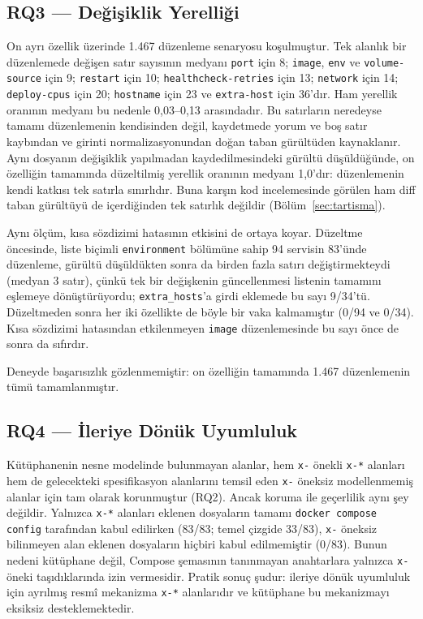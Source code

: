 \documentclass[12pt,a4paper]{article}
\begin{document}
\subsection{RQ3 --- Değişiklik Yerelliği}
On ayrı özellik üzerinde 1.467 düzenleme senaryosu koşulmuştur. Tek
alanlık bir düzenlemede değişen satır sayısının medyanı \texttt{port}
için 8; \texttt{image}, \texttt{env} ve \texttt{volume-source} için 9;
\texttt{restart} için 10; \texttt{healthcheck-retries} için 13;
\texttt{network} için 14; \texttt{deploy-cpus} için 20;
\texttt{hostname} için 23 ve \texttt{extra-host} için 36'dır. Ham
yerellik oranının medyanı bu nedenle 0,03--0,13 arasındadır. Bu satırların
neredeyse tamamı düzenlemenin kendisinden değil, kaydetmede yorum ve boş
satır kaybından ve girinti normalizasyonundan doğan taban gürültüden
kaynaklanır. Aynı dosyanın değişiklik yapılmadan kaydedilmesindeki gürültü
düşüldüğünde, on özelliğin tamamında düzeltilmiş yerellik oranının medyanı
1,0'dır: düzenlemenin kendi katkısı tek satırla sınırlıdır. Buna karşın kod
incelemesinde görülen ham diff taban gürültüyü de içerdiğinden tek
satırlık değildir (Bölüm~\ref{sec:tartisma}).

Aynı ölçüm, kısa sözdizimi hatasının etkisini de ortaya koyar. Düzeltme
öncesinde, liste biçimli \texttt{environment} bölümüne sahip 94 servisin
83'ünde düzenleme, gürültü düşüldükten sonra da birden fazla satırı
değiştirmekteydi (medyan 3 satır), çünkü tek bir değişkenin güncellenmesi
listenin tamamını eşlemeye dönüştürüyordu; \texttt{extra\_hosts}'a girdi
eklemede bu sayı 9/34'tü. Düzeltmeden sonra her iki özellikte de böyle bir
vaka kalmamıştır (0/94 ve 0/34). Kısa sözdizimi hatasından etkilenmeyen
\texttt{image} düzenlemesinde bu sayı önce de sonra da sıfırdır.

Deneyde başarısızlık gözlenmemiştir: on özelliğin tamamında 1.467
düzenlemenin tümü tamamlanmıştır.

\subsection{RQ4 --- İleriye Dönük Uyumluluk}
Kütüphanenin nesne modelinde bulunmayan alanlar, hem \texttt{x-} önekli
\texttt{x-*} alanları hem de gelecekteki spesifikasyon alanlarını temsil eden
\texttt{x-} öneksiz modellenmemiş alanlar için tam olarak korunmuştur
(RQ2). Ancak koruma ile geçerlilik aynı şey değildir. Yalnızca
\texttt{x-*} alanları eklenen dosyaların tamamı
\texttt{docker compose config} tarafından kabul edilirken (83/83; temel
çizgide 33/83), \texttt{x-} öneksiz bilinmeyen alan eklenen dosyaların
hiçbiri kabul edilmemiştir (0/83). Bunun nedeni kütüphane değil, Compose
şemasının tanınmayan anahtarlara yalnızca \texttt{x-} öneki taşıdıklarında
izin vermesidir. Pratik sonuç şudur: ileriye dönük uyumluluk için ayrılmış
resmî mekanizma \texttt{x-*} alanlarıdır ve kütüphane bu mekanizmayı
eksiksiz desteklemektedir.
\end{document}
